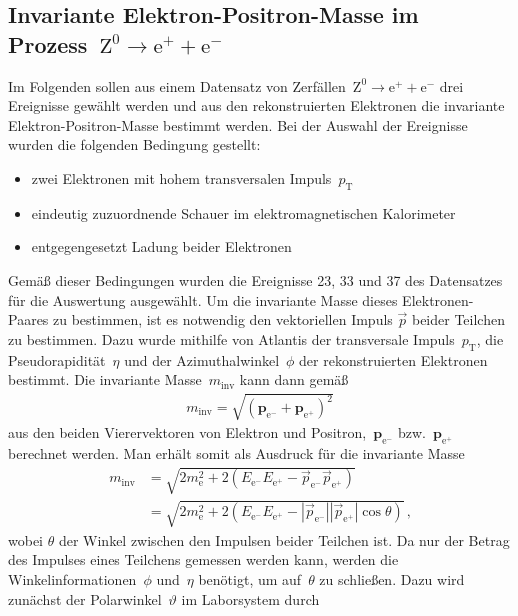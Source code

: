 \documentclass[11pt, a4paper]{article}
\numberwithin{equation}{section}
\begin{document}
\subsection{Invariante Elektron-Positron-Masse im Prozess~$\mathrm{Z}^0 \rightarrow \mathrm{e}^+ + \mathrm{e}^-$}
Im Folgenden sollen aus einem Datensatz von Zerfällen~$\mathrm{Z}^0 \rightarrow \mathrm{e}^+ + \mathrm{e}^-$ drei Ereignisse gewählt werden und aus den rekonstruierten Elektronen die invariante Elektron-Positron-Masse bestimmt werden.
Bei der Auswahl der Ereignisse wurden die folgenden Bedingung gestellt:
\begin{itemize}
	\item zwei Elektronen mit hohem transversalen Impuls~$p_\mathrm{T}$
	\item eindeutig zuzuordnende Schauer im elektromagnetischen Kalorimeter
	\item entgegengesetzt Ladung beider Elektronen
\end{itemize}
Gemäß dieser Bedingungen wurden die Ereignisse 23, 33 und 37 des Datensatzes für die Auswertung ausgewählt.
Um die invariante Masse dieses Elektronen-Paares zu bestimmen, ist es notwendig den vektoriellen Impuls $\vec{p}$ beider Teilchen zu bestimmen.
Dazu wurde mithilfe von Atlantis der transversale Impuls~$p_\mathrm{T}$, die Pseudorapidität~$\eta$ und der Azimuthalwinkel~$\phi$ der rekonstruierten Elektronen bestimmt.
Die invariante Masse~$m_\mathrm{inv}$ kann dann gemäß
\begin{align*}
	m_\mathrm{inv}=\sqrt{(\mathbf{p}_{\mathrm{e}^-}+\mathbf{p}_{\mathrm{e}^+})^2}
\end{align*}
aus den beiden Vierervektoren von Elektron und Positron,~$\mathbf{p}_{\mathrm{e}^-}$ bzw.~$\mathbf{p}_{\mathrm{e}^+}$ berechnet werden.
Man erhält somit als Ausdruck für die invariante Masse
\begin{align}
	m_\mathrm{inv}&=\sqrt{2 m^2_{\mathrm{e}} + 2 ( E_{\mathrm{e}^-} E_{\mathrm{e}^+} - \vec{p}_{\mathrm{e}^-}\vec{p}_{\mathrm{e}^+} )} \nonumber \\
	&=\sqrt{ 2m^2_{\mathrm{e}} + 2 (E_{\mathrm{e}^-} E_{\mathrm{e}^+} - |\vec{p}_{\mathrm{e}^-}||\vec{p}_{\mathrm{e}^+}|\cos\theta)}\,\text{,}
	\label{eq:inv_mass}
\end{align}
wobei $\theta$ der Winkel zwischen den Impulsen beider Teilchen ist.
Da nur der Betrag des Impulses eines Teilchens gemessen werden kann, werden die Winkelinformationen~$\phi$ und~$\eta$ benötigt, um auf~$\theta$ zu schließen.
Dazu wird zunächst der Polarwinkel~$\vartheta$ im Laborsystem durch
\end{document}
